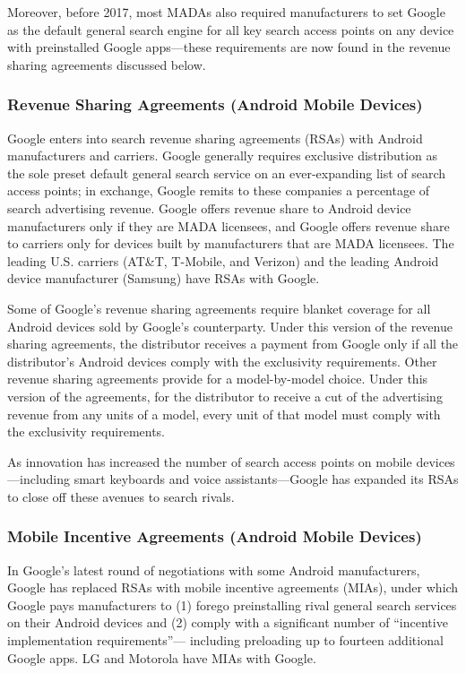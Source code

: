 \documentclass[11pt,b5paper,headings=small]{scrartcl}
\begin{document}

Moreover, before 2017, most MADAs also required manufacturers to set Google
as the default general search engine for all key search access points on any device with
preinstalled Google apps—these requirements are now found in the revenue sharing agreements
discussed below.




\subsubsection{Revenue Sharing Agreements (Android Mobile Devices)}
Google enters into search revenue sharing agreements (RSAs) with Android
manufacturers and carriers. Google generally requires exclusive distribution as the sole preset
default general search service on an ever-expanding list of search access points; in exchange,
Google remits to these companies a percentage of search advertising revenue. Google offers
revenue share to Android device manufacturers only if they are MADA licensees, and Google
offers revenue share to carriers only for devices built by manufacturers that are MADA
licensees. The leading U.S. carriers (AT\&T, T-Mobile, and Verizon) and the leading Android
device manufacturer (Samsung) have RSAs with Google.


Some of Google’s revenue sharing agreements require blanket coverage for all
Android devices sold by Google’s counterparty. Under this version of the revenue sharing
agreements, the distributor receives a payment from Google only if all the distributor’s Android
devices comply with the exclusivity requirements. Other revenue sharing agreements provide for
a model-by-model choice. Under this version of the agreements, for the distributor to receive a
cut of the advertising revenue from any units of a model, every unit of that model must comply
with the exclusivity requirements.


As innovation has increased the number of search access points on mobile
devices—including smart keyboards and voice assistants—Google has expanded its RSAs to
close off these avenues to search rivals.




\subsubsection{Mobile Incentive Agreements (Android Mobile Devices)}
In Google’s latest round of negotiations with some Android manufacturers,
Google has replaced RSAs with mobile incentive agreements (MIAs), under which Google pays
manufacturers to (1) forego preinstalling rival general search services on their Android devices
and (2) comply with a significant number of “incentive implementation requirements”—
including preloading up to fourteen additional Google apps. LG and Motorola have MIAs with
Google.
\end{document}
